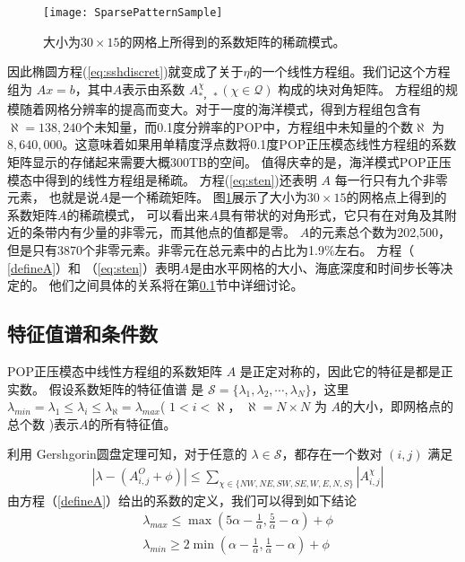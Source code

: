 \begin{figure}
\centering
\texttt{[image: SparsePatternSample]}
\caption[] {大小为$30\times 15$的网格上所得到的系数矩阵的稀疏模式。 \label{fig:spy}}
\end{figure}
因此椭圆方程(\ref{eq:sshdiscret})就变成了关于$\eta$的一个线性方程组。我们记这个方程组为 $Ax= b$，其中$A$表示由系数 $A_{*，*}^{\chi } ( \chi \in \mathcal{Q} )$ 构成的块对角矩阵。
方程组的规模随着网格分辨率的提高而变大。对于一度的海洋模式，得到方程组包含有$\aleph = 138,240$个未知量，而0.1度分辨率的POP中，方程组中未知量的个数$\aleph$ 为$8,640,000$。这意味着如果用单精度浮点数将0.1度POP正压模态线性方程组的系数矩阵显示的存储起来需要大概300TB的空间。
值得庆幸的是，海洋模式POP正压模态中得到的线性方程组是稀疏。
方程(\ref{eq:sten})还表明 $A$ 每一行只有九个非零元素， 也就是说$A$是一个稀疏矩阵。 图\ref{fig:spy}展示了大小为$30\times 15$的网格点上得到的系数矩阵$A$的稀疏模式， 可以看出来$A$具有带状的对角形式，它只有在对角及其附近的条带内有少量的非零元，而其他点的值都是零。
$A$的元素总个数为202,500，但是只有3870个非零元素。非零元在总元素中的占比为1.9\%左右。
方程（ \ref{defineA}）和 （\ref{eq:sten}）表明$A$是由水平网格的大小、海底深度和时间步长等决定的。
他们之间具体的关系将在第\ref{solver:Algorithm:condition}节中详细讨论。

\subsection{特征值谱和条件数}
\label{solver:Algorithm:condition}

POP正压模态中线性方程组的系数矩阵 $A$ 是正定对称的\cite{smith2010parallel}，因此它的特征是都是正实数\cite{stewart1976positive}。
假设系数矩阵的特征值谱\cite{golub2012matrix} 是 $\mathcal{S} = \{\lambda_1, \lambda_2, \cdots, \lambda_N\}$，这里 $\lambda_{min} = \lambda_1 \le \lambda_i \le \lambda_\aleph = \lambda_{max}$( $1<i <\aleph $， $\aleph=N\times N$ 为 $A$的大小，即网格点的总个数 )表示$A$的所有特征值。

利用 Gershgorin圆盘定理\cite{bell1965gershgorin}可知，对于任意的 $\lambda \in \mathcal{S}$，都存在一个数对 $(i,j)$ 满足
\begin{align}
&|\lambda -  (A_{i,j}^O + \phi ) | \le \sum_{\chi \in \{NW,NE,SW,SE,W,E,N,S\}}|A_{i,j}^\chi|
\end{align}
由方程（\ref{defineA}）给出的系数的定义，我们可以得到如下结论 
\begin{align} \label{eigsGersh}
&\lambda_{max} \le  \max (  5\alpha - \frac{1}{\alpha}, \frac{5}{\alpha}- \alpha) +\phi   \\
&\lambda_{min} \ge 2\min (  \alpha - \frac{1}{\alpha},\frac{1} {\alpha} -  \alpha) + \phi
\end{align}

